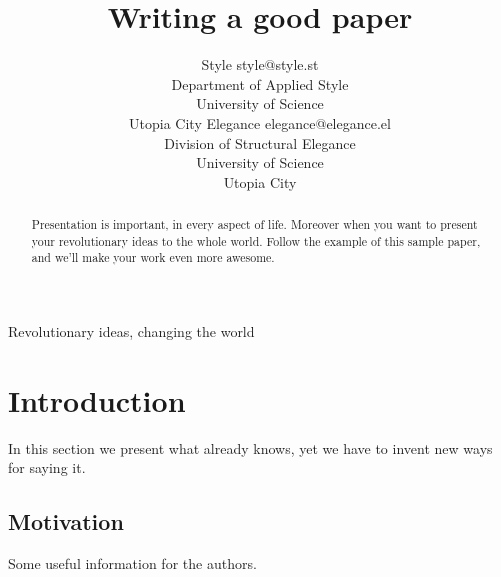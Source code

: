 \documentclass[twoside,11pt]{article}
\begin{document}
\title{Writing a good paper}

\author{\name Style \email style@style.st \\
       \addr Department of Applied Style \\
       University of Science \\ 
       Utopia City 
       \AND
       \name Elegance \email elegance@elegance.el \\
       \addr Division of Structural Elegance \\
       University of Science \\ 
       Utopia City}


\maketitle

\begin{abstract}%
Presentation is important, in every aspect of life. 
Moreover when you want to present your revolutionary ideas to the whole
world. Follow the example of this sample paper, and we'll make your work even more awesome. 
\end{abstract}

\begin{keywords}
  Revolutionary ideas, changing the world
\end{keywords}
\section{Introduction}

In this section we present what already knows, yet we have to invent new ways for saying it. 

\subsection{Motivation}

Some useful information for the authors.
\end{document}
